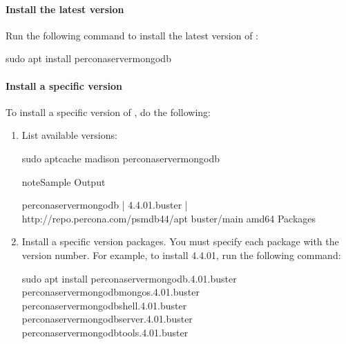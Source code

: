 \documentclass[letterpaper,10pt,english]{sphinxmanual}
\begin{document}
\paragraph{Install the latest version}
\label{\detokenize{install/apt:install-the-latest-version}}
\sphinxAtStartPar
Run the following command to install the latest version of :

\begin{sphinxVerbatim}[commandchars=\\\{\}]
\PYGZdl{} sudo apt install percona\PYGZhy{}server\PYGZhy{}mongodb
\end{sphinxVerbatim}


\paragraph{Install a specific version}
\label{\detokenize{install/apt:install-a-specific-version}}
\sphinxAtStartPar
To install a specific version of , do the following:
\begin{enumerate}
%
\item {} 
\sphinxAtStartPar
List available versions:

\begin{sphinxVerbatim}[commandchars=\\\{\}]
\PYGZdl{} sudo apt\PYGZhy{}cache madison percona\PYGZhy{}server\PYGZhy{}mongodb
\end{sphinxVerbatim}

\begin{sphinxadmonition}{note}{Sample Output}

\begin{sphinxVerbatim}[commandchars=\\\{\}]
percona\PYGZhy{}server\PYGZhy{}mongodb | 4.4.0\PYGZhy{}1.buster | http://repo.percona.com/psmdb\PYGZhy{}44/apt buster/main amd64 Packages
\end{sphinxVerbatim}
\end{sphinxadmonition}

\item {} 
\sphinxAtStartPar
Install a specific version packages. You must specify each package with the version number. For example, to install  4.4.0\sphinxhyphen{}1, run the following command:

\begin{sphinxVerbatim}[commandchars=\\\{\}]
\PYGZdl{} sudo apt install percona\PYGZhy{}server\PYGZhy{}mongodb.4.0\PYGZhy{}1.buster percona\PYGZhy{}server\PYGZhy{}mongodb\PYGZhy{}mongos.4.0\PYGZhy{}1.buster percona\PYGZhy{}server\PYGZhy{}mongodb\PYGZhy{}shell.4.0\PYGZhy{}1.buster percona\PYGZhy{}server\PYGZhy{}mongodb\PYGZhy{}server.4.0\PYGZhy{}1.buster percona\PYGZhy{}server\PYGZhy{}mongodb\PYGZhy{}tools.4.0\PYGZhy{}1.buster
\end{sphinxVerbatim}

\end{enumerate}
\end{document}
